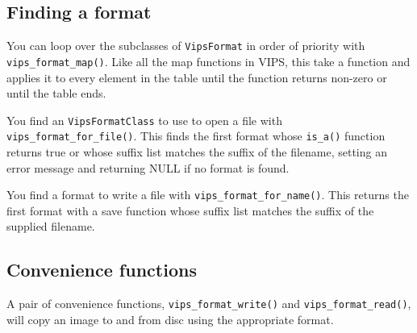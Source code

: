 \subsection{Finding a format}

You can loop over the subclasses of \verb+VipsFormat+ in order of priority
with \verb+vips_format_map()+. Like all the map functions in VIPS, this take
a function and applies it to every element in the table until the function
returns non-zero or until the table ends.

You find an \verb+VipsFormatClass+ to use to open a file with
\verb+vips_format_for_file()+. This finds the first format whose \verb+is_a()+
function returns true or whose suffix list matches the suffix of the filename,
setting an error message and returning NULL if no format is found.

You find a format to write a file with \verb+vips_format_for_name()+. This
returns the first format with a save function whose suffix list matches the
suffix of the supplied filename.

\subsection{Convenience functions}

A pair of convenience functions, \verb+vips_format_write()+ and
\verb+vips_format_read()+, will copy an image to and from disc using the
appropriate format.
